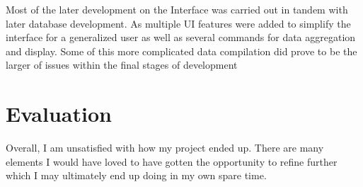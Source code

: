 \documentclass[12pt,a4paper]{report}
\begin{document}
  \par
  Most of the later development on the Interface was carried out in tandem with later database development. As multiple UI features were added to simplify the interface for a generalized user as well as several commands for data aggregation and display. Some of this more complicated data compilation did prove to be the larger of issues within the final stages of development

\chapter{Evaluation}
\label{eval}
  Overall, I am unsatisfied with how my project ended up. There are many elements I would have loved to have gotten the opportunity to refine further which I may ultimately end up doing in my own spare time.
\end{document}
